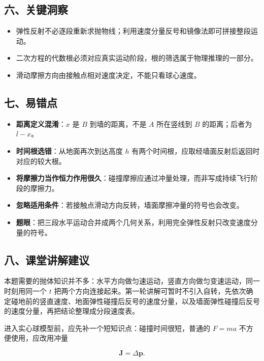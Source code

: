 \documentclass[12pt,a4paper,UTF8]{ctexart}
\newcommand{\tightlist}{\setlength{\itemsep}{0pt}\setlength{\parskip}{0pt}}
\begin{document}
\subsection{六、关键洞察}\label{ux516dux5173ux952eux6d1eux5bdf}

\begin{itemize}
\tightlist
\item
  弹性反射不必逐段重新求抛物线；利用速度分量反号和镜像法即可拼接整段运动。
\item
  二次方程的代数根必须对应真实运动阶段，根的筛选属于物理推理的一部分。
\item
  滑动摩擦方向由接触点相对速度决定，不能只看球心速度。
\end{itemize}

\subsection{七、易错点}\label{ux4e03ux6613ux9519ux70b9}

\begin{itemize}
\tightlist
\item
  \textbf{距离定义混淆}：\(x\) 是 \(B\) 到墙的距离，不是 \(A\)
  所在竖线到 \(B\) 的距离；后者为 \(l-x\)。
\item
  \textbf{时间根选错}：从地面再次到达高度 \(h\)
  有两个时间根，应取经墙面反射后返回时对应的较大根。
\item
  \textbf{将摩擦力当作恒力作用很久}：碰撞摩擦应通过冲量处理，而非写成持续飞行阶段的摩擦力。
\item
  \textbf{忽略适用条件}：若接触点滑动方向反转，墙面摩擦冲量的符号也会改变。
\item
  \textbf{题眼}：把三段水平运动合并成两个几何关系，利用完全弹性反射只改变速度分量的符号。
\end{itemize}

\subsection{八、课堂讲解建议}\label{ux516bux8bfeux5802ux8bb2ux89e3ux5efaux8bae}

本题需要的抛体知识并不多：水平方向做匀速运动，竖直方向做匀变速运动，同一时刻用同一个
\(t\)
把两个方向连接起来。第一轮讲解可暂时不引入自转，先依次确定碰地前的竖直速度、地面弹性碰撞后反号的速度分量，以及墙面弹性碰撞后反号的速度分量，再把结论整理成分段速度表。

进入实心球模型前，应先补一个短知识点：碰撞时间很短，普通的 \(F=ma\)
不方便使用，应改用冲量

\[\boldsymbol J=\Delta\boldsymbol p.\]
\end{document}
